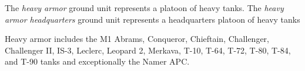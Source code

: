 
The \emph{heavy armor} ground unit represents a platoon of heavy tanks. The \emph{heavy armor headquarters} ground unit represents a headquarters platoon of heavy tanks

Heavy armor includes the M1 Abrams, Conqueror, Chieftain, Challenger, Challenger II, IS-3, Leclerc, Leopard 2, Merkava, T-10, T-64, T-72, T-80, T-84, and T-90 tanks and exceptionally the Namer APC.
